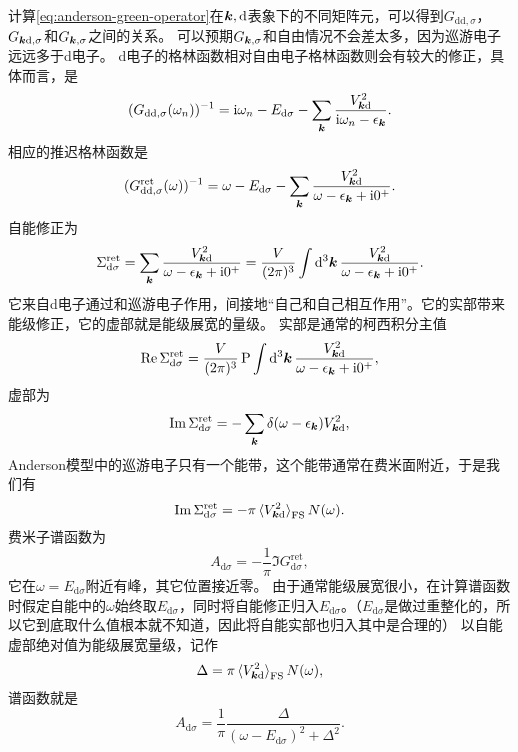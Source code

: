 计算\eqref{eq:anderson-green-operator}在$\vb*{k}, \text{d}$表象下的不同矩阵元，可以得到$G_{\text{dd}, \sigma}$，$G_{\vb*{k} \text{d}, \sigma}$和$G_{\vb*{k}, \sigma}$之间的关系。
可以预期$G_{\vb*{k}, \sigma}$和自由情况不会差太多，因为巡游电子远远多于d电子。
d电子的格林函数相对自由电子格林函数则会有较大的修正，具体而言，是
\begin{equation}
    (G_{\text{dd}, \sigma}(\omega_n))^{-1} = \mathrm{i} \omega_n - E_{\text{d}\sigma} - \sum_{\vb*{k}} \frac{V_{\vb*{k}\text{d}}^2}{\mathrm{i} \omega_n - \epsilon_{\vb*{k}}}.
\end{equation}
相应的推迟格林函数是
\begin{equation}
    (G_{\text{dd}, \sigma}^\text{ret}(\omega))^{-1} = \omega - E_{\text{d}\sigma} - \sum_{\vb*{k}} \frac{V_{\vb*{k}\text{d}}^2}{\omega - \epsilon_{\vb*{k}} + \mathrm{i} 0^+}.
\end{equation}
自能修正为
\begin{equation}
    \Sigma_{\text{d} \sigma}^\text{ret} = \sum_{\vb*{k}} \frac{V_{\vb*{k}\text{d}}^2}{\omega - \epsilon_{\vb*{k}} + \mathrm{i} 0^+} = \frac{V}{(2\pi)^3} \int \dd[3]{\vb*{k}} \frac{V_{\vb*{k}\text{d}}^2}{\omega - \epsilon_{\vb*{k}} + \mathrm{i} 0^+}.
\end{equation}
它来自d电子通过和巡游电子作用，间接地“自己和自己相互作用”。它的实部带来能级修正，它的虚部就是能级展宽的量级。
实部是通常的柯西积分主值
\[
    \Re \Sigma_{\text{d} \sigma}^\text{ret} = \frac{V}{(2\pi)^3} \operatorname{P} \int \dd[3]{\vb*{k}} \frac{V_{\vb*{k}\text{d}}^2}{\omega - \epsilon_{\vb*{k}} + \mathrm{i} 0^+},
\]
虚部为
\[
    \Im \Sigma_{\text{d} \sigma}^\text{ret} = - \sum_{\vb*{k}} \delta(\omega - \epsilon_{\vb*{k}}) V_{\vb*{k} \text{d}}^2, 
\]
Anderson模型中的巡游电子只有一个能带，这个能带通常在费米面附近，于是我们有
\[
    \Im \Sigma_{\text{d} \sigma}^\text{ret} = - \pi \expval*{V_{\vb*{k} \text{d}}^2}_\text{FS} N(\omega).
\]
费米子谱函数为
\[
    A_{\text{d} \sigma} = -\frac{1}{\pi} \Im G_{\text{d} \sigma}^\text{ret},
\]
它在$\omega = E_{\text{d} \sigma}$附近有峰，其它位置接近零。
由于通常能级展宽很小，在计算谱函数时假定自能中的$\omega$始终取$E_{\text{d} \sigma}$，同时将自能修正归入$E_{\text{d} \sigma}$。（$E_{\text{d} \sigma}$是做过重整化的，所以它到底取什么值根本就不知道，因此将自能实部也归入其中是合理的）
以自能虚部绝对值为能级展宽量级，记作
\begin{equation}
    \Delta = \pi \expval*{V_{\vb*{k} \text{d}}^2}_\text{FS} N(\omega),
\end{equation}
谱函数就是
\begin{equation}
    A_{\text{d}\sigma} = \frac{1}{\pi} \frac{\Delta}{(\omega-E_{\text{d}\sigma})^2 + \Delta^2}.
    \label{eq:anderson-spectral}
\end{equation}

